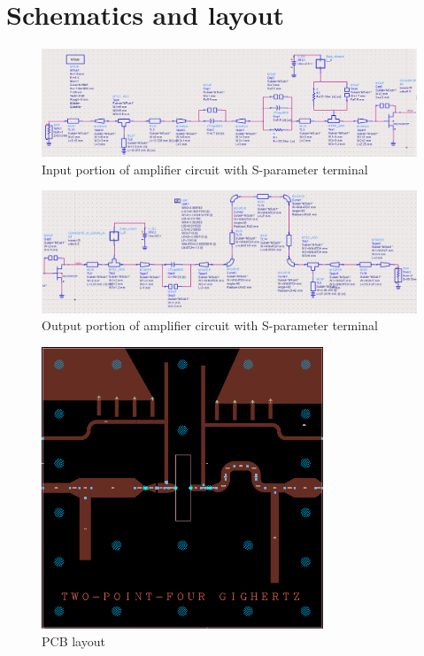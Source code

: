 \chapter{Schematics and layout}

  \begin{figure}[h]
	  \centering
	  \includegraphics[width=\textwidth]{img/Circuit_input}
	  \caption{Input portion of amplifier circuit with S-parameter terminal}
	  \label{fig:Schem_Input}
  \end{figure}

  \begin{figure}[H]
	  \centering
	  \includegraphics[width=\textwidth]{img/Circuit_output}
	  \caption{Output portion of amplifier circuit with S-parameter terminal}
	  \label{fig:Schem_Output}
  \end{figure}

  \begin{figure}[h]
	  \centering
	  \includegraphics[width=0.75\textwidth]{img/Layout_ads}
	  \caption{PCB layout}
	  \label{fig:Layout}
  \end{figure}



